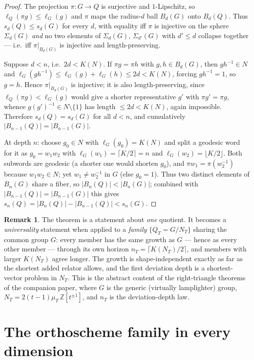 \documentclass[11pt]{article}
\newcommand{\Z}{\mathbb{Z}}
\theoremstyle{definition}
\newtheorem{remark}[theorem]{Remark}
\begin{document}
\begin{proof}
The projection $\pi:G\to Q$ is surjective and $1$-Lipschitz, so $\ell_Q(\pi g)\le\ell_G(g)$ and
$\pi$ maps the radius-$d$ ball $B_d(G)$ onto $B_d(Q)$. Thus $s_d(Q)\le s_d(G)$ for every $d$, with
equality iff $\pi$ is injective on the sphere $\Sigma_d(G)$ \emph{and} no two elements of
$\Sigma_d(G)$, $\Sigma_{d'}(G)$ with $d'\le d$ collapse together --- i.e.\ iff $\pi|_{B_d(G)}$ is
injective and length-preserving.

Suppose $d<n$, i.e.\ $2d<K(N)$. If $\pi g=\pi h$ with $g,h\in B_d(G)$, then $gh^{-1}\in N$ and
$\ell_G(gh^{-1})\le \ell_G(g)+\ell_G(h)\le 2d<K(N)$, forcing $gh^{-1}=1$, so $g=h$. Hence
$\pi|_{B_d(G)}$ is injective; it is also length-preserving, since $\ell_Q(\pi g)<\ell_G(g)$ would
give a shorter representative $g'$ with $\pi g'=\pi g$, whence $g(g')^{-1}\in N\setminus\{1\}$ has
length $\le 2d<K(N)$, again impossible. Therefore $s_d(Q)=s_d(G)$ for all $d<n$, and cumulatively
$|B_{n-1}(Q)|=|B_{n-1}(G)|$.

At depth $n$: choose $g_0\in N$ with $\ell_G(g_0)=K(N)$ and split a geodesic word for it as
$g_0=w_1w_2$ with $\ell_G(w_1)=\lceil K/2\rceil=n$ and $\ell_G(w_2)=\lfloor K/2\rfloor$. Both
subwords are geodesic (a shorter one would shorten $g_0$), and $\pi w_1=\pi(w_2^{-1})$ because
$w_1w_2\in N$; yet $w_1\ne w_2^{-1}$ in $G$ (else $g_0=1$). Thus two distinct elements of
$B_n(G)$ share a fiber, so $|B_n(Q)|<|B_n(G)|$; combined with $|B_{n-1}(Q)|=|B_{n-1}(G)|$ this
gives $s_n(Q)=|B_n(Q)|-|B_{n-1}(Q)|<s_n(G)$.
\end{proof}

\begin{remark}
The theorem is a statement about \emph{one} quotient. It becomes a \emph{universality} statement
when applied to a \emph{family} $\{Q_T=G/N_T\}$ sharing the common group $G$: every member has the
same growth as $G$ --- hence as every other member --- through its own horizon
$n_T=\lceil K(N_T)/2\rceil$, and members with larger $K(N_T)$ agree longer. The growth is
shape-independent exactly as far as the shortest added relator allows, and the first deviation
depth is a shortest-vector problem in $N_T$. This is the abstract content of the right-triangle
theorems of the companion paper, where $G$ is the generic (virtually lamplighter) group,
$N_T=2(t-1)\mu_T\,\Z[t^{\pm1}]$, and $n_T$ is the deviation-depth law.
\end{remark}

\section{The orthoscheme family in every dimension}
\end{document}
